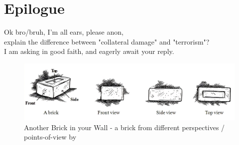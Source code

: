 \documentclass[16pt,openany,oneside]{book}
\begin{document}
\chapter*{Epilogue}

Ok bro/bruh, I'm all ears, please anon, \\ 
explain the difference between "collateral damage" and "terrorism"?  \\ 
I am asking in good faith, and eagerly await your reply. 

\begin{figure}[H]
    \centering
    \includegraphics[width=\linewidth]{assets/brick.png}
    \caption{Another Brick in your Wall - a brick from different perspectives / points-of-view by \cite{amirite2023brick}}
    \label{fig:brick-pov}
\end{figure}
\end{document}
